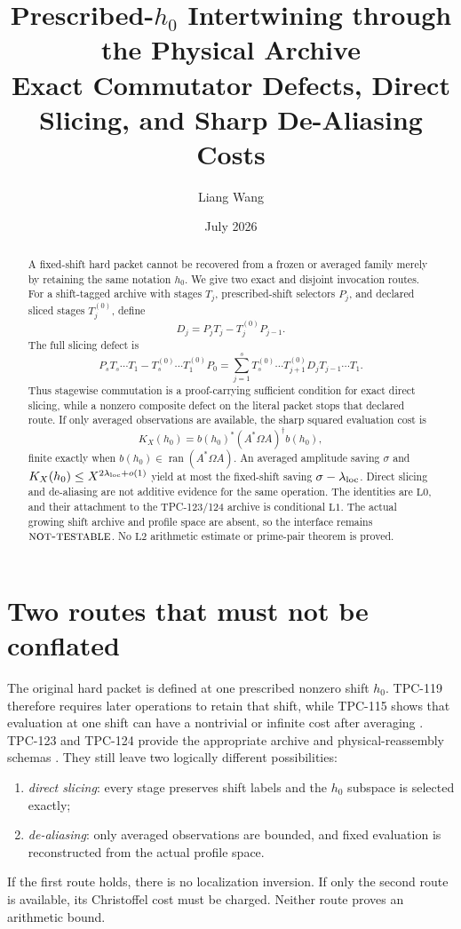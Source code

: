 \documentclass[11pt]{article}
\title{\textbf{Prescribed-\(h_0\) Intertwining through the Physical Archive}\\
\large Exact Commutator Defects, Direct Slicing, and Sharp
De-Aliasing Costs}
\author{Liang Wang}
\date{July 2026}
\theoremstyle{definition}
\theoremstyle{remark}
\newcommand{\Ran}{\operatorname{ran}}
\newcommand{\Lzero}{\mathrm{L0}}
\newcommand{\Lone}{\mathrm{L1}}
\newcommand{\Ltwo}{\mathrm{L2}}
\newcommand{\NT}{\textsc{not-testable}}
\begin{document}
\maketitle

\begin{abstract}
A fixed-shift hard packet cannot be recovered from a frozen or
averaged family merely by retaining the same notation \(h_0\).  We
give two exact and disjoint invocation routes.  For a shift-tagged
archive with stages \(T_j\), prescribed-shift selectors \(P_j\), and
declared sliced stages \(T_j^{(0)}\), define
\[
 D_j=P_jT_j-T_j^{(0)}P_{j-1}.
\]
The full slicing defect is
\[
 P_sT_s\cdots T_1-T_s^{(0)}\cdots T_1^{(0)}P_0
 =
 \sum_{j=1}^s
 T_s^{(0)}\cdots T_{j+1}^{(0)}
 D_jT_{j-1}\cdots T_1.
\]
Thus stagewise commutation is a proof-carrying sufficient condition
for exact direct slicing, while a nonzero composite defect on the
literal packet stops that declared route.  If only averaged
observations are available, the sharp squared evaluation cost is
\[
 K_X(h_0)=b(h_0)^*(A^*\Omega A)^\dagger b(h_0),
\]
finite exactly when \(b(h_0)\in\Ran(A^*\Omega A)\).  An averaged
amplitude saving \(\sigma\) and
\(K_X(h_0)\le X^{2\lambda_{\rm loc}+o(1)}\) yield at most the
fixed-shift saving \(\sigma-\lambda_{\rm loc}\).  Direct slicing and
de-aliasing are not additive evidence for the same operation.  The
identities are \(\Lzero\), and their attachment to the TPC-123/124
archive is conditional \(\Lone\).  The actual growing shift archive
and profile space are absent, so the interface remains \(\NT\).
No \(\Ltwo\) arithmetic estimate or prime-pair theorem is proved.
\end{abstract}

\section{Two routes that must not be conflated}

The original hard packet is defined at one prescribed nonzero shift
\(h_0\).  TPC-119 therefore requires later operations to retain that
shift, while TPC-115 shows that evaluation at one shift can have a
nontrivial or infinite cost after averaging
\citep{WangTPC115,WangTPC119}.  TPC-123 and TPC-124 provide the
appropriate archive and physical-reassembly schemas
\citep{WangTPC123,WangTPC124}.  They still leave two logically
different possibilities:
\begin{enumerate}[label=(\roman*),leftmargin=2.2em]
\item \emph{direct slicing}: every stage preserves shift labels and
the \(h_0\) subspace is selected exactly;
\item \emph{de-aliasing}: only averaged observations are bounded, and
fixed evaluation is reconstructed from the actual profile space.
\end{enumerate}
If the first route holds, there is no localization inversion.  If
only the second route is available, its Christoffel cost must be
charged.  Neither route proves an arithmetic bound.
\end{document}
